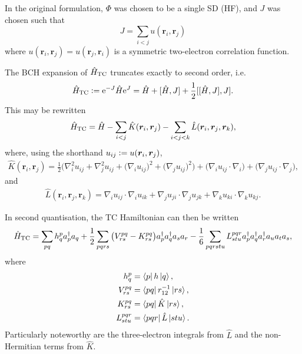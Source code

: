 In the original formulation, $\Phi$ was chosen to be a single \gls{SD} (\gls{HF}), and $J$ was chosen such that
\begin{equation}
    \label{eq:jastrow-two-elec}
    J = \sum_{i<j}u(\bm r_i, \bm r_j)
\end{equation}
where $u(\bm r_i, \bm r_j) = u(\bm r_j, \bm r_i)$ is a symmetric two-electron correlation function.

The \gls{BCH} expansion of $\hat H_\mathrm{TC}$ truncates exactly to second order, i.e.
\begin{equation}
    \hat H_\mathrm{TC} \mathrel{\mathop:}= \mathrm{e}^{-J}\hat H\mathrm{e}^J= \hat H + [\hat H, J] + \frac 12[[\hat H,J],J].
\end{equation}
This may be rewritten
\begin{equation}
    \hat H_\mathrm{TC} = \hat H - \sum_{i<j}\hat K(\bm r_i, \bm r_j) - \sum_{i<j<k}\hat L(\bm r_i, \bm r_j, \bm r_k),
\end{equation}
where, using the shorthand $u_{ij} \mathrel{\mathop:}= u(\bm r_i, \bm r_j)$,
\begin{equation}
\begin{split}
    \hat{K}(\bm{r}_i, \bm{r}_j) = \frac{1}{2} \Bigg(
        \nabla_i^2 u_{ij} + \nabla_j^2 u_{ij} +
        \big(\nabla_i u_{ij}\big)^2
        + \big(\nabla_j u_{ij}\big)^2\Bigg)
        + \big(\nabla_i u_{ij} \cdot \nabla_i\big)
        + \big(\nabla_j u_{ij} \cdot \nabla_j\big)
        ,
\end{split}
\end{equation}
and
\begin{equation}
\begin{split}
\hat{L}(\bm{r}_i, \bm{r}_j, \bm{r}_k) =
\nabla_i u_{ij} \cdot \nabla_i u_{ik} +
\nabla_j u_{ji} \cdot \nabla_j u_{jk} +
\nabla_k u_{ki} \cdot \nabla_k u_{kj}.
\end{split}
\end{equation}

In second quantisation, the TC Hamiltonian can then be written
\begin{equation}
    \hat H_\mathrm{TC} = \sum_{pq} h_q^p a_p^\dagger a_q
    + \frac{1}{2} \sum_{pqrs} \big(V_{rs}^{pq} - K_{rs}^{pq}\big)
    a_p^\dagger a_q^\dagger a_s a_r
    - \frac{1}{6} \sum_{pqrstu} L_{stu}^{pqr}
    a_p^\dagger a_q^\dagger a_r^\dagger a_u a_t a_s,
\end{equation}
where
\begin{equation}
\begin{split}
    h_q^p &= \bra{p}h\ket{q}, \\
    V_{rs}^{pq} &= \bra{p q } r_{12}^{-1} \ket{ r s}, \\
    K_{rs}^{pq} &= \bra{p q } \hat{K} \ket{ r s}, \\
    L_{stu}^{pqr} &= \bra{p q r } \hat{L} \ket{s t u}.
\end{split}
\end{equation}
Particularly noteworthy are the three-electron integrals from $\hat L$ and the non-Hermitian terms from $\hat K$.

